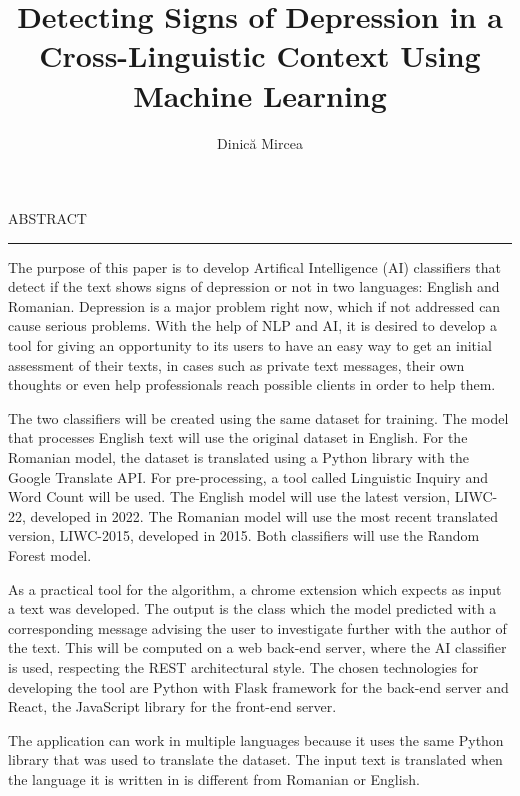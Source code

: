 \documentclass[12pt]{report}
\begin{document}
\title{Detecting Signs of Depression in a Cross-Linguistic Context Using Machine Learning}					   
\author{Dinică Mircea}											
				
\maketitle


\newpage
\thispagestyle{empty}
\mbox{}
\newpage
{} 

\cleardoublepage
ABSTRACT
\vspace{0.5cm}	
\hrule
\vspace{0.5cm}	

The purpose of this paper is to develop Artifical Intelligence (AI) classifiers that detect if the text shows signs of depression or not in two languages: English and Romanian. Depression is a major problem right now, which if not addressed can cause serious problems. With the help of NLP and AI, it is desired to develop a tool for giving an opportunity to its users to have an easy way to get an initial assessment of their texts, in cases such as private text messages, their own thoughts or even help professionals reach possible clients in order to help them. 

The two classifiers will be created using the same dataset for training. The model that processes English text will use the original dataset in English. For the Romanian model, the dataset is translated using a Python library with the Google Translate API. For pre-processing, a tool called Linguistic Inquiry and Word Count will be used. The English model will use the latest version, LIWC-22, developed in 2022. The Romanian model will use the most recent translated version, LIWC-2015, developed in 2015. Both classifiers will use the Random Forest model.

As a practical tool for the algorithm, a chrome extension which expects as input a text was developed. The output is the class which the model predicted with a corresponding message advising the user to investigate further with the author of the text. This will be computed on a web back-end server, where the AI classifier is used, respecting the REST architectural style. The chosen technologies for developing the tool are Python with Flask framework for the back-end server and React, the JavaScript library for the front-end server.

The application can work in multiple languages because it uses the same Python library that was used to translate the dataset. The input text is translated when the language it is written in is different from Romanian or English.  
\end{document}
